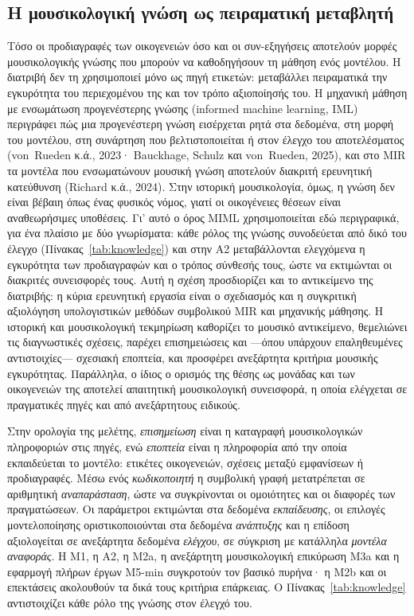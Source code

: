 \documentclass[a4paper]{article}
\begin{document}
\subsection{Η μουσικολογική γνώση ως πειραματική μεταβλητή}\label{sec:miml}
Τόσο οι προδιαγραφές των οικογενειών όσο και οι συν-εξηγήσεις αποτελούν μορφές μουσικολογικής γνώσης που μπορούν να καθοδηγήσουν τη μάθηση ενός μοντέλου. Η διατριβή δεν τη χρησιμοποιεί μόνο ως πηγή ετικετών: μεταβάλλει πειραματικά την εγκυρότητα του περιεχομένου της και τον τρόπο αξιοποίησής του. Η μηχανική μάθηση με ενσωμάτωση προγενέστερης γνώσης (informed machine learning, IML) περιγράφει πώς μια προγενέστερη γνώση εισέρχεται ρητά στα δεδομένα, στη μορφή του μοντέλου, στη συνάρτηση που βελτιστοποιείται ή στον έλεγχο του αποτελέσματος (von~Rueden κ.ά., 2023· Bauckhage, Schulz και von~Rueden, 2025), και στο MIR τα μοντέλα που ενσωματώνουν μουσική γνώση αποτελούν διακριτή ερευνητική κατεύθυνση (Richard κ.ά., 2024). Στην ιστορική μουσικολογία, όμως, η γνώση δεν είναι βέβαιη όπως ένας φυσικός νόμος, γιατί οι οικογένειες θέσεων είναι αναθεωρήσιμες υποθέσεις. Γι' αυτό ο όρος MIML χρησιμοποιείται εδώ περιγραφικά, για ένα πλαίσιο με δύο γνωρίσματα: κάθε ρόλος της γνώσης συνοδεύεται από δικό του έλεγχο (Πίνακας~\ref{tab:knowledge}) και στην Α2 μεταβάλλονται ελεγχόμενα η εγκυρότητα των προδιαγραφών και ο τρόπος σύνθεσής τους, ώστε να εκτιμώνται οι διακριτές συνεισφορές τους. Αυτή η σχέση προσδιορίζει και το αντικείμενο της διατριβής: η κύρια ερευνητική εργασία είναι ο σχεδιασμός και η συγκριτική αξιολόγηση υπολογιστικών μεθόδων συμβολικού MIR και μηχανικής μάθησης. Η ιστορική και μουσικολογική τεκμηρίωση καθορίζει το μουσικό αντικείμενο, θεμελιώνει τις διαγνωστικές σχέσεις, παρέχει επισημειώσεις και ---όπου υπάρχουν επαληθευμένες αντιστοιχίες--- σχεσιακή εποπτεία, και προσφέρει ανεξάρτητα κριτήρια μουσικής εγκυρότητας. Παράλληλα, ο ίδιος ο ορισμός της θέσης ως μονάδας και των οικογενειών της αποτελεί απαιτητική μουσικολογική συνεισφορά, η οποία ελέγχεται σε πραγματικές πηγές και από ανεξάρτητους ειδικούς.

Στην ορολογία της μελέτης, \emph{επισημείωση} είναι η καταγραφή μουσικολογικών πληροφοριών στις πηγές, ενώ \emph{εποπτεία} είναι η πληροφορία από την οποία εκπαιδεύεται το μοντέλο: ετικέτες οικογενειών, σχέσεις μεταξύ εμφανίσεων ή προδιαγραφές. Μέσω ενός \emph{κωδικοποιητή} η συμβολική γραφή μετατρέπεται σε αριθμητική \emph{αναπαράσταση}, ώστε να συγκρίνονται οι ομοιότητες και οι διαφορές των πραγματώσεων. Οι παράμετροι εκτιμώνται στα δεδομένα \emph{εκπαίδευσης}, οι επιλογές μοντελοποίησης οριστικοποιούνται στα δεδομένα \emph{ανάπτυξης} και η επίδοση αξιολογείται σε ανεξάρτητα δεδομένα \emph{ελέγχου}, σε σύγκριση με κατάλληλα \emph{μοντέλα αναφοράς}. Η Μ1, η Α2, η Μ2a, η ανεξάρτητη μουσικολογική επικύρωση Μ3a και η εφαρμογή πλήρων έργων Μ5-min συγκροτούν τον βασικό πυρήνα· η Μ2b και οι επεκτάσεις ακολουθούν τα δικά τους κριτήρια επάρκειας. Ο Πίνακας~\ref{tab:knowledge} αντιστοιχίζει κάθε ρόλο της γνώσης στον έλεγχό του.
\end{document}
